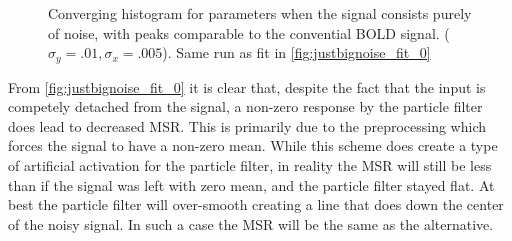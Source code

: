 \begin{figure}[H]
\caption{Converging histogram for parameters when the signal consists purely of noise, with peaks comparable  to 
the convential BOLD signal. ($\sigma_y = .01, \sigma_x = .005$). Same run as fit in \autoref{fig:justbignoise_fit_0}}
\label{fig:JustNoiseConvergenceLarge}
\end{figure}

From \autoref{fig:justbignoise_fit_0} it is clear that, despite the fact that the input 
is competely detached from the signal, a non-zero response by the particle filter does
lead to decreased MSR. This is primarily due to the preprocessing which forces the signal to
have a non-zero mean. While this scheme does create a type of artificial activation for
the particle filter, in reality the MSR will still be less than if the signal was left
with zero mean, and the particle filter stayed flat. At best the particle filter will 
over-smooth creating a line that does down the center of the noisy signal. In such a case
the MSR will be the same as the alternative. 

